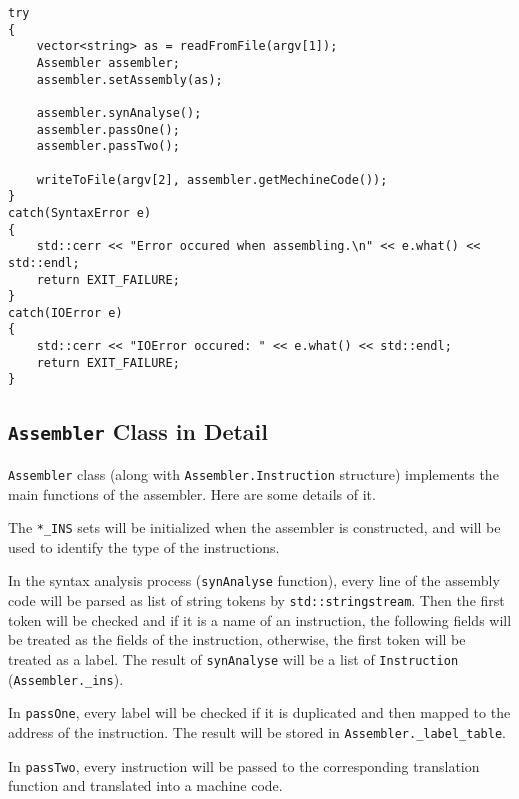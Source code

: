 \documentclass[a4paper]{article}
\begin{document}
\begin{verbatim}
try
{
    vector<string> as = readFromFile(argv[1]);
    Assembler assembler;
    assembler.setAssembly(as);

    assembler.synAnalyse();
    assembler.passOne();
    assembler.passTwo();

    writeToFile(argv[2], assembler.getMechineCode());
}
catch(SyntaxError e)
{
    std::cerr << "Error occured when assembling.\n" << e.what() << std::endl;
    return EXIT_FAILURE;
}
catch(IOError e)
{
    std::cerr << "IOError occured: " << e.what() << std::endl;
    return EXIT_FAILURE;
}
\end{verbatim}

\subsection{\texttt{Assembler} Class in Detail}\label{assembler_class}
\verb|Assembler| class (along with \verb|Assembler.Instruction| structure) implements the main functions of the
assembler. Here are some details of it.

The \verb|*_INS| sets will be initialized when the assembler is constructed, and will be used to identify
the type of the instructions.

In the syntax analysis process (\verb|synAnalyse| function), every line of the assembly code will be
parsed as list of string tokens by \verb|std::stringstream|. Then the first token will be checked and
if it is a name of an instruction, the following fields will be treated as the fields of the instruction,
otherwise, the first token will be treated as a label. The result of \verb|synAnalyse| will be a list of
\verb|Instruction| (\verb|Assembler._ins|).

In \verb|passOne|, every label will be checked if it is duplicated and then mapped to the address of the
instruction. The result will be stored in \verb|Assembler._label_table|.

In \verb|passTwo|, every instruction will be passed to the corresponding translation function
and translated into a machine code.
\end{document}
